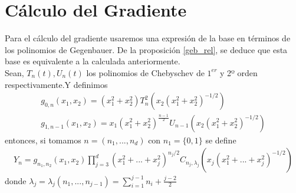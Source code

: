 \chapter[Cálculo del Gradiente]
		{Cálculo del Gradiente}
Para el cálculo del gradiente usaremos una expresión de la base en términos de los polinomios de Gegenbauer. De la proposición \hyperref[]{\ref{geb_rel}}, se deduce que esta base es equivalente a la calculada anteriormente.
\\
Sean, $T_{n}(t),U_{n}(t)$ los polinomios de Chebyschev de $1^{er}$ y 2º orden respectivamente.Y definimos
\begin{gather*}
 g_{0,n}(x_1,x_2) = (x_1^2+x_2^2)T_n^2(x_2(x_1^2+x_2^2)^{-1/2})
\\
g_{1,n-1}(x_1,x_2) = x_1(x_1^2+x_2^2)^{\frac{n-1}{2}}U_{n-1}(x_2(x_1^2+x_2^2)^{-1/2})
\end{gather*}
entonces, si tomamos $n=(n_1,...,n_d)$ con $n_1 = \{0,1\}$ se define
\begin{gather*}
Y_n = g_{n_1,n_2}(x_1,x_2)\prod_{j=3}^{d}(x_1^2+...+x_j^2)^{n_j/2}C_{n_j,\lambda_j}(x_j(x_1^2+...+x_j^2)^{-1/2})
\end{gather*}
donde $\lambda_j =\lambda_j(n_1,...,n_{j-1}) = \sum_{i=1}^{j-1}n_i + \frac{j-2}{2}$
\medskip

